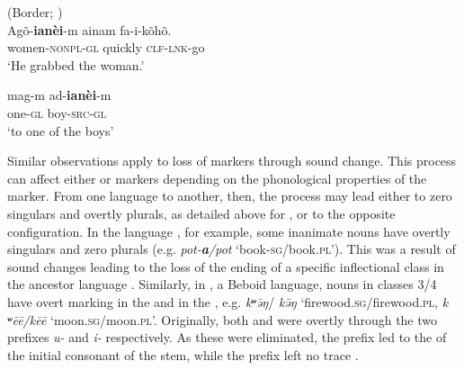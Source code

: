 \documentclass[output=paper]{langsci/langscibook}
\begin{document}
\ea\label{imonda2}
 (Border; )\\
\ea
\gll Agõ-\textbf{{ianèi}}-m ainam fa-i-kõhõ.\\
women-\textsc{nonpl-gl} quickly \textsc{clf-lnk}-go\\
\glt `He grabbed the woman.' 

\ex
\gll mag-m ad-\textbf{{ianèi}}-m \\
one-\textsc{gl} boy-\textsc{src-gl} \\
\glt `to one of the boys'


\z
\z


Similar observations apply to loss of  markers through sound
change. This process can affect
either  or  markers depending on the phonological
properties of the marker. From one language to another, then, the process may lead either to  zero  singulars and
overtly  plurals, as detailed above for
, or to the opposite configuration. In the
 language ,  for example, some inanimate nouns have
overtly  singulars and
zero  plurals
 (e.g. {\em pot-\textbf{\textit {a}}/pot} `book-\textsc{sg}/book.\textsc{pl}'). This was a result of
 sound changes leading to the loss of the  ending of a specific inflectional class in the ancestor language
 \citep[250--256]{NitzNordhoff2010}. Similarly, in , a Beboid
 language, nouns in classes 3/4 have overt
  marking in the  and  in the , e.g. {\em
    k{\bf ʷ}\=əŋ}/{\em
    k\=əŋ} `firewood.\textsc{sg}/firewood.\textsc{pl}, {\em k{\bf
      ʷ}ēē/kēē} `moon.\textsc{sg}/moon.\textsc{pl}'.
  Originally, both  and  were  overtly through the
  two prefixes {\em *u-} and {\em *i-} respectively. As these were
  eliminated, the  prefix led to the  of the
  initial consonant of the stem, while the  prefix left no trace
  \citep{Hombert1980}.
\end{document}

